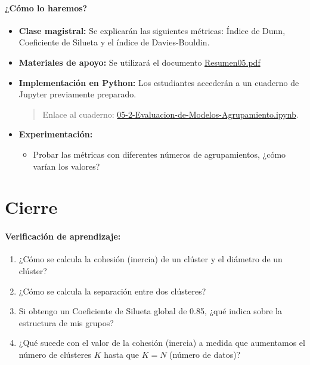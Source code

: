 \documentclass[a4,11pt]{aleph-notas}
\begin{document}
\paragraph{¿Cómo lo haremos?}  
\begin{itemize}[leftmargin=*]
    \item \textbf{Clase magistral:} Se explicarán las siguientes métricas: Índice de Dunn, Coeficiente de Silueta y el índice de Davies-Bouldin.
    \item \textbf{Materiales de apoyo:} 
    Se utilizará el documento \href{https://andres-merino.github.io/AprendizajeAutomaticoInicial-05-N0105/2-Resumenes/Resumen05.pdf}{Resumen05.pdf}
    \item \textbf{Implementación en Python:} Los estudiantes accederán a un cuaderno de Jupyter previamente preparado.
    \begin{quote}
        Enlace al cuaderno: \href{https://colab.research.google.com/github/andres-merino/AprendizajeAutomaticoInicial-05-N0105/blob/main/2-Notebooks/05-2-Evaluacion-de-Modelos-Agrupamiento.ipynb}{05-2-Evaluacion-de-Modelos-Agrupamiento.ipynb}.
    \end{quote}

    \item \textbf{Experimentación:} 
    \begin{itemize}
        \item Probar las métricas con diferentes números de agrupamientos, ¿cómo varían los valores?
    \end{itemize}
    
\end{itemize}


\section*{Cierre}

\paragraph{Verificación de aprendizaje:} 
\begin{enumerate}[leftmargin=*]
    \item ¿Cómo se calcula la cohesión (inercia) de un clúster y el diámetro de un clúster?
    
    \item ¿Cómo se calcula la separación entre dos clústeres?
    
    \item Si obtengo un Coeficiente de Silueta global de 0.85, ¿qué indica sobre la estructura de mis grupos?
    
    \item ¿Qué sucede con el valor de la cohesión (inercia) a medida que aumentamos el número de clústeres $K$ hasta que $K=N$ (número de datos)?
\end{enumerate}
\end{document}
